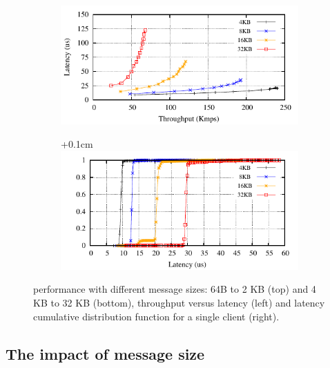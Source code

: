 \begin{figure}[ht]
\begin{subfigure}{\columnwidth}
  \end{subfigure}
  \begin{subfigure}{\columnwidth}
    \advance\leftskip-0.1cm
    \includegraphics[width=0.99\columnwidth]{figures/benchmark/graphs/figure-performance-vs-size-single-group-from-4k}
  \end{subfigure}
  \begin{subfigure}{\columnwidth}
    \advance\leftskip+0.1cm
    \includegraphics[width=0.96\columnwidth]{figures/benchmark/graphs/figure-performance-vs-size-single-group-cdf-from-4k}
  \end{subfigure}
  \caption{\libname performance with different message sizes: 64B to 2 KB (top) and 4 KB to 32 KB (bottom), throughput versus latency (left) and latency cumulative distribution function for a single client (right).}
  \label{fig:1group_message_size}
\end{figure}

\subsection{The impact of message size}
\label{sec:evaluation:micro}

